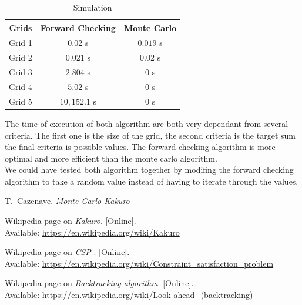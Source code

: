 \documentclass[journal, a4paper]{IEEEtran}
\begin{document}
    \begin{table}[!hbt]
        \begin{center}
        \caption{Simulation}
        \label{tab:simParameters}
        \begin{tabular}{|c|c|c|}
            \hline
           Grids & Forward Checking &  Monte Carlo \\
            \hline
           Grid 1& $0.02$ s  &  $ 0.019 $ s  \\
            \hline
           Grid 2 & $0.021$ s  &  $ 0.02 $ s  \\
            \hline
           Grid 3 & $ 2.804  $ s  &  $ 0 $ s  \\
            \hline
           Grid 4 & $5.02$ s  &  $ 0 $ s  \\
            \hline
           Grid 5 & $ 10,152.1$ s  &  $ 0 $ s  \\
            \hline
        \end{tabular}
        \end{center}
    \end{table}
The time of execution of both algorithm are both very dependant from several criteria. The first one is the size of the grid, the second criteria is the target sum the final criteria is possible values.
The forward checking algorithm is more optimal and more efficient than the monte carlo algorithm. \\
We could have tested both algorithm together by modifing the forward checking algorithm to take a random value instead of having to iterate through the values.

\begin{thebibliography}{5}
    T.~Cazenave. {\em Monte-Carlo Kakuro}

   Wikipedia page on {\em Kakuro}. [Online]. \\ Available:  \url{ https://en.wikipedia.org/wiki/Kakuro}

   Wikipedia page on {\em CSP }. [Online]. \\ Available:  \url{https://en.wikipedia.org/wiki/Constraint_satisfaction_problem}

   Wikipedia page on {\em Backtracking algorithm}. [Online]. \\ Available:  \url{https://en.wikipedia.org/wiki/Look-ahead_(backtracking)}

\end{thebibliography}
\end{document}
